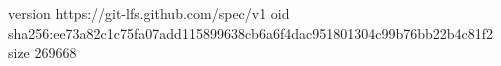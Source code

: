 version https://git-lfs.github.com/spec/v1
oid sha256:ee73a82c1c75fa07add115899638cb6a6f4dac951801304c99b76bb22b4c81f2
size 269668
